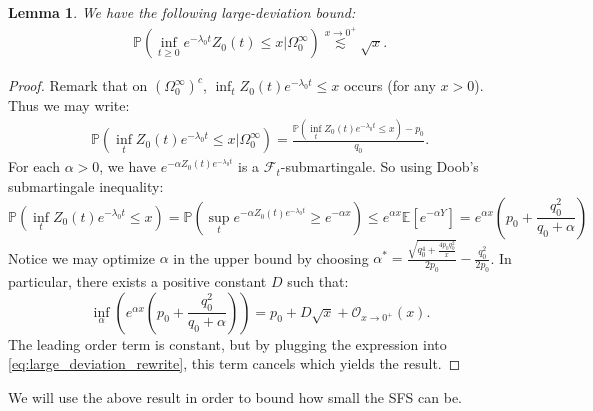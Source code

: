 \documentclass{article}
\numberwithin{equation}{section}
\newtheorem{lemma}{Lemma}
\newcommand{\lsimas}[2]{\overset{{#1}\to {#2}}{\lesssim}}
\begin{document}
\begin{lemma}\label{lem:large_deviation_bound}
    We have the following large-deviation bound:
    \begin{align*}
        \mathbb{P}(\inf_{t\geq 0} e^{-\lambda_0 t}Z_0(t)\leq x|\Omega_0^\infty)\lsimas{x}{0^+}\sqrt{x}.
    \end{align*}
\end{lemma}
\begin{proof}
    Remark that on $(\Omega_0^\infty)^c$, $\inf_t Z_0(t)e^{-\lambda_0 t}\leq x$ occurs (for any $x>0$). Thus we may write:
    \begin{align}
        \mathbb{P}(\inf_t Z_0(t)e^{-\lambda_0t}\leq x|\Omega_0^\infty)=\frac{\mathbb{P}(\inf_t Z_0(t)e^{-\lambda_0t}\leq x)-p_0}{q_0}\label{eq:large_deviation_rewrite}.
    \end{align}
    For each $\alpha>0$, we have $e^{-\alpha Z_0(t)e^{-\lambda_0 t}}$ is a $\mathcal{F}_t$-submartingale. So using Doob's submartingale inequality:
    \[\mathbb{P}(\inf_t Z_0(t)e^{-\lambda_0t}\leq x)=\mathbb{P}(\sup_t e^{-\alpha Z_0(t)e^{-\lambda_0 t}}\geq e^{-\alpha x})\leq e^{\alpha x}\mathbb{E}[e^{-\alpha Y}]=e^{\alpha x}\left(p_0+\frac{q_0^2}{q_0+\alpha}\right)\]
    Notice we may optimize $\alpha$ in the upper bound by choosing $\alpha^*=\frac{\sqrt{q_0^4+\frac{4p_0q_0^2}{x}}}{2p_0}-\frac{q_0^2}{2p_0}$. In particular, there exists a positive constant $D$ such that:
    \[\inf_\alpha \left(e^{\alpha x}\left(p_0+\frac{q_0^2}{q_0+\alpha}\right)\right)=p_0+D\sqrt{x}+\mathcal{O}_{x\to 0^+}(x).\]
    The leading order term is constant, but by plugging the expression into \ref{eq:large_deviation_rewrite}, this term cancels which yields the result.
\end{proof}

We will use the above result in order to bound how small the SFS can be.
\end{document}
